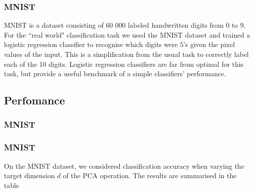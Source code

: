 \documentclass[11pt, oneside]{amsart}
\begin{document}
\subsubsection{MNIST}
MNIST is a dataset consisting of 60 000 labeled handwritten digits from 0 to 9. For the ``real world" classification task we used the MNIST dataset and trained a logistic regression classifier to recognise which digits were $5$'s given the pixel values of the input. This is a simplification from the usual task to correctly label each of the 10 digits. Logistic regression classifiers are far from optimal for this task, but provide a useful benchmark of a simple classifiers' performance.

\subsection{Perfomance}
\subsubsection{MNIST}
\subsubsection{MNIST}
On the MNIST dataset, we considered classification accuracy when varying the target dimension $d$ of the PCA operation. The results are summarised in the table 



\nocite{Bishop2006}


\end{document}
